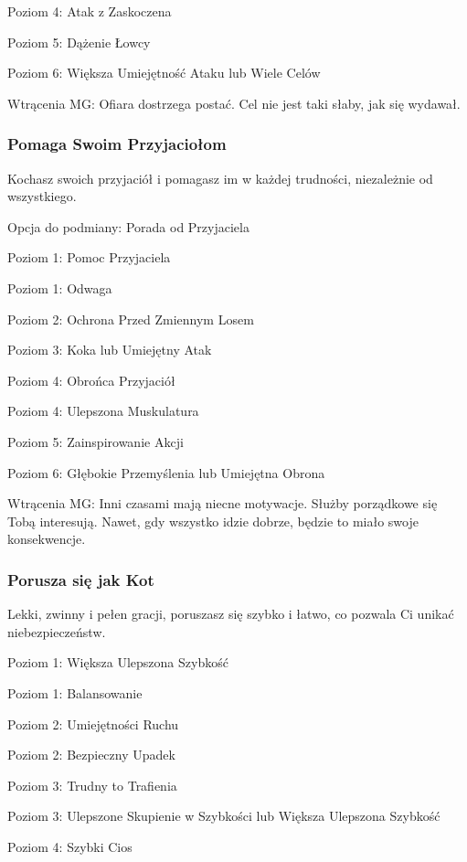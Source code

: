 Poziom 4: Atak z Zaskoczena

Poziom 5: Dążenie Łowcy

Poziom 6: Większa Umiejętność Ataku lub Wiele Celów

Wtrącenia MG: Ofiara dostrzega postać. Cel nie jest taki słaby, jak się wydawał.

\subsubsection{Pomaga Swoim Przyjaciołom}

Kochasz swoich przyjaciół i pomagasz im w każdej trudności, niezależnie od wszystkiego.

Opcja do podmiany: Porada od Przyjaciela

Poziom 1: Pomoc Przyjaciela

Poziom 1: Odwaga

Poziom 2:  Ochrona Przed Zmiennym Losem

Poziom 3: Koka lub Umiejętny Atak

Poziom 4: Obrońca Przyjaciół

Poziom 4: Ulepszona Muskulatura

Poziom 5: Zainspirowanie Akcji

Poziom 6: Głębokie Przemyślenia lub Umiejętna Obrona

Wtrącenia MG: Inni czasami mają niecne motywacje. Służby porządkowe się Tobą interesują. Nawet, gdy wszystko idzie dobrze, będzie to miało swoje konsekwencje. 

\subsubsection{Porusza się jak Kot}

Lekki, zwinny i pełen gracji, poruszasz się szybko i łatwo, co pozwala Ci unikać niebezpieczeństw.

Poziom 1: Większa Ulepszona Szybkość

Poziom 1: Balansowanie

Poziom 2: Umiejętności Ruchu

Poziom 2: Bezpieczny Upadek

Poziom 3: Trudny to Trafienia

Poziom 3: Ulepszone Skupienie w Szybkości lub  Większa Ulepszona Szybkość

Poziom 4: Szybki Cios

